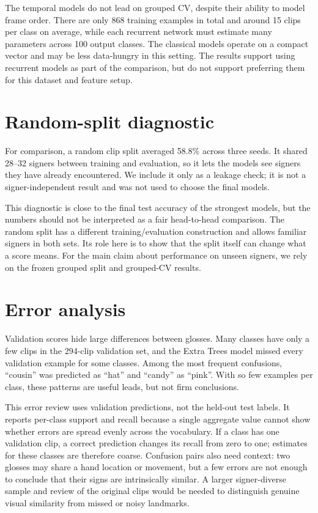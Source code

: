 \documentclass[12pt,a4paper,oneside]{report}
\begin{document}
The temporal models do not lead on grouped CV, despite their ability to model frame order. There are only 868 training examples in total and around 15 clips per class on average, while each recurrent network must estimate many parameters across 100 output classes. The classical models operate on a compact vector and may be less data-hungry in this setting. The results support using recurrent models as part of the comparison, but do not support preferring them for this dataset and feature setup.

\section{Random-split diagnostic}
For comparison, a random clip split averaged 58.8\% across three seeds. It shared 28--32 signers between training and evaluation, so it lets the models see signers they have already encountered. We include it only as a leakage check; it is not a signer-independent result and was not used to choose the final models.

This diagnostic is close to the final test accuracy of the strongest models, but the numbers should not be interpreted as a fair head-to-head comparison. The random split has a different training/evaluation construction and allows familiar signers in both sets. Its role here is to show that the split itself can change what a score means. For the main claim about performance on unseen signers, we rely on the frozen grouped split and grouped-CV results.

\section{Error analysis}
Validation scores hide large differences between glosses. Many classes have only a few clips in the 294-clip validation set, and the Extra Trees model missed every validation example for some classes. Among the most frequent confusions, ``cousin'' was predicted as ``hat'' and ``candy'' as ``pink''. With so few examples per class, these patterns are useful leads, but not firm conclusions.

This error review uses validation predictions, not the held-out test labels. It reports per-class support and recall because a single aggregate value cannot show whether errors are spread evenly across the vocabulary. If a class has one validation clip, a correct prediction changes its recall from zero to one; estimates for these classes are therefore coarse. Confusion pairs also need context: two glosses may share a hand location or movement, but a few errors are not enough to conclude that their signs are intrinsically similar. A larger signer-diverse sample and review of the original clips would be needed to distinguish genuine visual similarity from missed or noisy landmarks.
\end{document}
